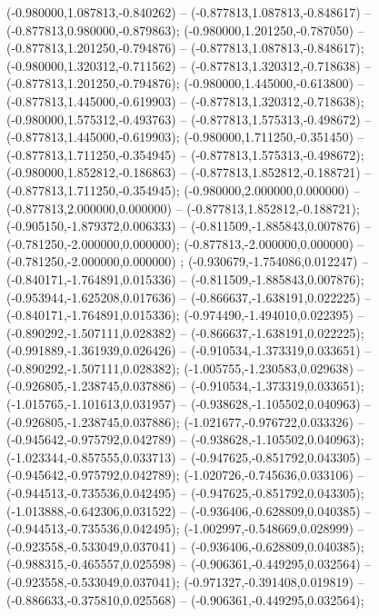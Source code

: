  (-0.980000,1.087813,-0.840262) -- (-0.877813,1.087813,-0.848617) -- (-0.877813,0.980000,-0.879863);
 (-0.980000,1.201250,-0.787050) -- (-0.877813,1.201250,-0.794876) -- (-0.877813,1.087813,-0.848617);
 (-0.980000,1.320312,-0.711562) -- (-0.877813,1.320312,-0.718638) -- (-0.877813,1.201250,-0.794876);
 (-0.980000,1.445000,-0.613800) -- (-0.877813,1.445000,-0.619903) -- (-0.877813,1.320312,-0.718638);
 (-0.980000,1.575312,-0.493763) -- (-0.877813,1.575313,-0.498672) -- (-0.877813,1.445000,-0.619903);
 (-0.980000,1.711250,-0.351450) -- (-0.877813,1.711250,-0.354945) -- (-0.877813,1.575313,-0.498672);
 (-0.980000,1.852812,-0.186863) -- (-0.877813,1.852812,-0.188721) -- (-0.877813,1.711250,-0.354945);
 (-0.980000,2.000000,0.000000) -- (-0.877813,2.000000,0.000000) -- (-0.877813,1.852812,-0.188721);
 (-0.905150,-1.879372,0.006333) -- (-0.811509,-1.885843,0.007876) -- (-0.781250,-2.000000,0.000000);
 (-0.877813,-2.000000,0.000000) -- (-0.781250,-2.000000,0.000000) ;
 (-0.930679,-1.754086,0.012247) -- (-0.840171,-1.764891,0.015336) -- (-0.811509,-1.885843,0.007876);
 (-0.953944,-1.625208,0.017636) -- (-0.866637,-1.638191,0.022225) -- (-0.840171,-1.764891,0.015336);
 (-0.974490,-1.494010,0.022395) -- (-0.890292,-1.507111,0.028382) -- (-0.866637,-1.638191,0.022225);
 (-0.991889,-1.361939,0.026426) -- (-0.910534,-1.373319,0.033651) -- (-0.890292,-1.507111,0.028382);
 (-1.005755,-1.230583,0.029638) -- (-0.926805,-1.238745,0.037886) -- (-0.910534,-1.373319,0.033651);
 (-1.015765,-1.101613,0.031957) -- (-0.938628,-1.105502,0.040963) -- (-0.926805,-1.238745,0.037886);
 (-1.021677,-0.976722,0.033326) -- (-0.945642,-0.975792,0.042789) -- (-0.938628,-1.105502,0.040963);
 (-1.023344,-0.857555,0.033713) -- (-0.947625,-0.851792,0.043305) -- (-0.945642,-0.975792,0.042789);
 (-1.020726,-0.745636,0.033106) -- (-0.944513,-0.735536,0.042495) -- (-0.947625,-0.851792,0.043305);
 (-1.013888,-0.642306,0.031522) -- (-0.936406,-0.628809,0.040385) -- (-0.944513,-0.735536,0.042495);
 (-1.002997,-0.548669,0.028999) -- (-0.923558,-0.533049,0.037041) -- (-0.936406,-0.628809,0.040385);
 (-0.988315,-0.465557,0.025598) -- (-0.906361,-0.449295,0.032564) -- (-0.923558,-0.533049,0.037041);
 (-0.971327,-0.391408,0.019819) -- (-0.886633,-0.375810,0.025568) -- (-0.906361,-0.449295,0.032564);
